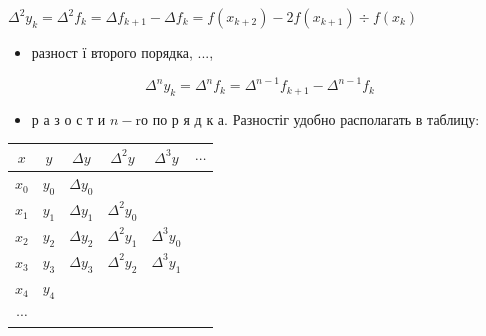 \documentclass[10pt]{article}
\begin{document}
$\Delta^{2} y_{k}=\Delta^{2} f_{k}=\Delta f_{k+1}-\Delta f_{k}=f\left(x_{k+2}\right)-2 f\left(x_{k+1}\right) \div f\left(x_{k}\right)$



\begin{itemize}

  \item разност ї второго порядка, ...,

\end{itemize}



\[

\Delta^{n} y_{k}=\Delta^{n} f_{k}=\Delta^{n-1} f_{k+1}-\Delta^{n-1} f_{k}

\]



\begin{itemize}

  \item р а з о с т и $n-\mathrm{r} о$ по р я д к а. Разностіг удобно располагать в таблицу:

\end{itemize}



\begin{center}

\begin{tabular}{c|c|c|c|c|c}

\hline

$x$ & $y$ & $\Delta y$ & $\Delta^{2} y$ & $\Delta^{3} y$ & $\cdots$ \\

\hline

$x_{0}$ & $y_{0}$ & $\Delta y_{0}$ &  &  &  \\

$x_{1}$ & $y_{1}$ & $\Delta y_{1}$ & $\Delta^{2} y_{0}$ &  &  \\

$x_{2}$ & $y_{2}$ & $\Delta y_{2}$ & $\Delta^{2} y_{1}$ & $\Delta^{3} y_{0}$ &  \\

$x_{3}$ & $y_{3}$ & $\Delta y_{3}$ & $\Delta^{2} y_{2}$ & $\Delta^{3} y_{1}$ &  \\

$x_{4}$ & $y_{4}$ &  &  &  &  \\

$\cdots$ &  &  &  &  &  \\

\hline

\end{tabular}

\end{center}
\end{document}
